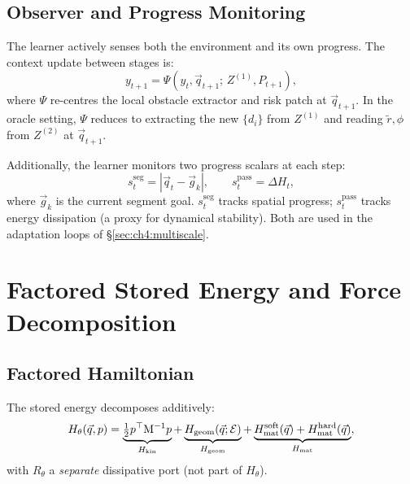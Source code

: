 \subsection{Observer and Progress Monitoring}
\label{subsec:ch4:observer}

The learner actively senses both the environment and its own progress.
The context update between stages is:
\begin{equation}
  y_{t+1} = \Psi(y_t, \vec{q}_{t+1};\, Z^{(1)}, P_{t+1}),
  \label{eq:ch4:observer}
\end{equation}
where $\Psi$ re-centres the local obstacle extractor and risk patch at
$\vec{q}_{t+1}$.
In the oracle setting, $\Psi$ reduces to extracting the new $\{d_i\}$
from $Z^{(1)}$ and reading $\tilde{r}, \phi$ from $Z^{(2)}$ at
$\vec{q}_{t+1}$.

Additionally, the learner monitors two progress scalars at each step:
\begin{equation}
  s_t^{\mathrm{seg}} = |\vec{q}_t - \vec{g}_k|,
  \qquad
  s_t^{\mathrm{pass}} = \Delta H_t,
  \label{eq:ch4:progress}
\end{equation}
where $\vec{g}_k$ is the current segment goal.
$s_t^{\mathrm{seg}}$ tracks spatial progress; $s_t^{\mathrm{pass}}$
tracks energy dissipation (a proxy for dynamical stability).
Both are used in the adaptation loops of §\ref{sec:ch4:multiscale}.

\section{Factored Stored Energy and Force Decomposition}
\label{sec:ch4:energy}

\subsection{Factored Hamiltonian}
\label{subsec:ch4:hamiltonian}

The stored energy decomposes additively:
\begin{equation}
  H_\theta(\vec{q},p)
  = \underbrace{\tfrac{1}{2}p^\top\mathrm{M}^{-1}p}_{H_{\mathrm{kin}}}
  + \underbrace{H_{\mathrm{geom}}(\vec{q};\mathcal{E})}_{H_{\mathrm{geom}}}
  + \underbrace{H_{\mathrm{mat}}^{\mathrm{soft}}(\vec{q}) + H_{\mathrm{mat}}^{\mathrm{hard}}(\vec{q})}_{H_{\mathrm{mat}}},
  \label{eq:ch4:ham_factored}
\end{equation}
with $R_\theta$ a \emph{separate} dissipative port (not part of
$H_\theta$).

